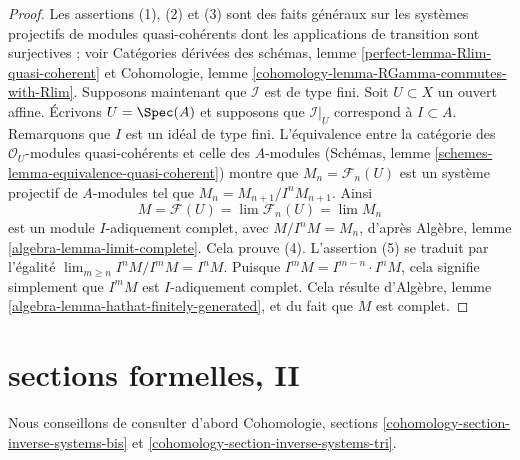 \begin{proof}
Les assertions (1), (2) et (3) sont des faits généraux sur les systèmes projectifs de
modules quasi-cohérents dont les applications de transition sont surjectives ; voir
Catégories dérivées des schémas, lemme \ref{perfect-lemma-Rlim-quasi-coherent}
et Cohomologie, lemme \ref{cohomology-lemma-RGamma-commutes-with-Rlim}.
Supposons maintenant que $\mathcal{I}$ est de type fini.
Soit $U \subset X$ un ouvert affine. Écrivons $U = \Spec(A)$ et supposons que $\mathcal{I}|_U$
correspond à $I \subset A$. Remarquons que $I$ est un idéal de type fini.
L'équivalence entre la catégorie des $\mathcal{O}_U$-modules quasi-cohérents
et celle des $A$-modules (Schémas, lemme \ref{schemes-lemma-equivalence-quasi-coherent})
montre que $M_n = \mathcal{F}_n(U)$ est un système projectif
de $A$-modules tel que $M_n = M_{n + 1}/I^nM_{n + 1}$. Ainsi
$$
M = \mathcal{F}(U) = \lim \mathcal{F}_n(U) = \lim M_n
$$
est un module $I$-adiquement complet, avec $M/I^nM = M_n$, d'après
Algèbre, lemme \ref{algebra-lemma-limit-complete}. Cela prouve (4).
L'assertion (5) se traduit par l'égalité
$\lim_{m \geq n} I^nM/I^mM = I^nM$.
Puisque $I^mM = I^{m - n} \cdot I^nM$, cela signifie simplement que
$I^mM$ est $I$-adiquement complet. Cela résulte
d'Algèbre, lemme \ref{algebra-lemma-hathat-finitely-generated},
et du fait que $M$ est complet.
\end{proof}





\section{sections formelles, II}
\label{section-formal-functions-principal}

\noindent
Nous conseillons de consulter d'abord
Cohomologie, sections
\ref{cohomology-section-inverse-systems-bis} et
\ref{cohomology-section-inverse-systems-tri}.

